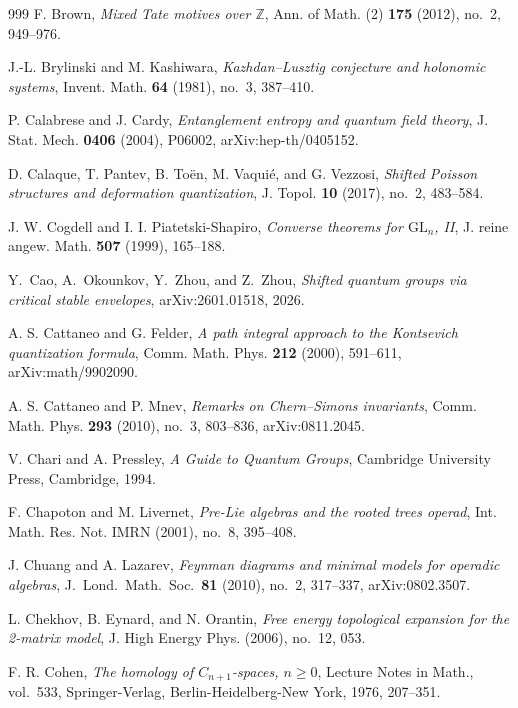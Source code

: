 \begin{thebibliography}{999}
F. Brown, \emph{Mixed Tate motives over $\mathbb{Z}$}, Ann. of Math. (2) \textbf{175} (2012), no.~2, 949--976.

J.-L. Brylinski and M. Kashiwara, \emph{Kazhdan--Lusztig conjecture and holonomic systems}, Invent. Math. \textbf{64} (1981), no.~3, 387--410.

P. Calabrese and J. Cardy, \emph{Entanglement entropy and quantum field theory}, J. Stat. Mech. \textbf{0406} (2004), P06002, arXiv:hep-th/0405152.

D. Calaque, T. Pantev, B. To\"en, M. Vaqui\'e, and G. Vezzosi, \emph{Shifted Poisson structures and deformation quantization}, J. Topol. \textbf{10} (2017), no.~2, 483--584.

J. W. Cogdell and I. I. Piatetski-Shapiro, \emph{Converse theorems for $\mathrm{GL}_n$, II}, J. reine angew. Math. \textbf{507} (1999), 165--188.

Y.~Cao, A.~Okounkov, Y.~Zhou, and Z.~Zhou, \emph{Shifted quantum groups via critical stable envelopes}, arXiv:2601.01518, 2026.

A. S. Cattaneo and G. Felder, \emph{A path integral approach to the Kontsevich quantization formula}, Comm. Math. Phys. \textbf{212} (2000), 591--611, arXiv:math/9902090.

A. S. Cattaneo and P. Mnev, \emph{Remarks on Chern--Simons invariants}, Comm. Math. Phys. \textbf{293} (2010), no.~3, 803--836, arXiv:0811.2045.

V. Chari and A. Pressley, \emph{A Guide to Quantum Groups}, Cambridge University Press, Cambridge, 1994.

F. Chapoton and M. Livernet, \emph{Pre-Lie algebras and the rooted trees operad}, Int. Math. Res. Not. IMRN (2001), no.~8, 395--408.

J. Chuang and A. Lazarev, \emph{Feynman diagrams and minimal models for operadic algebras}, J.~Lond.\ Math.\ Soc.\ \textbf{81} (2010), no.~2, 317--337, arXiv:0802.3507.

L. Chekhov, B. Eynard, and N. Orantin, \emph{Free energy topological expansion for the 2-matrix model}, J. High Energy Phys. (2006), no.~12, 053.

F. R. Cohen, \emph{The homology of $C_{n+1}$-spaces, $n \geq 0$}, Lecture Notes in Math., vol.~533, Springer-Verlag, Berlin-Heidelberg-New York, 1976, 207--351.


\end{thebibliography}
